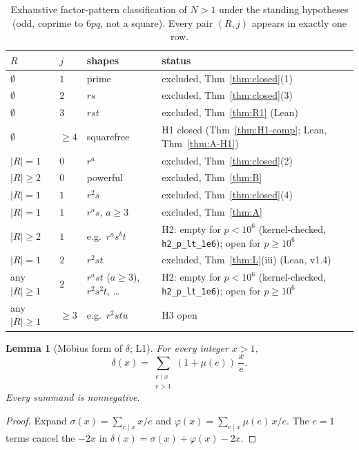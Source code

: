 \documentclass[11pt,reqno]{amsart}
\newcommand{\ph}{\varphi}
\newcommand{\sig}{\sigma}
\newtheorem{lemma}[theorem]{Lemma}
\theoremstyle{definition}
\begin{document}
\begin{table}[ht]
\centering
\caption{Exhaustive factor-pattern classification of \(N>1\) under the standing hypotheses (odd, coprime to \(6pq\), not a square). Every pair \((R,j)\) appears in exactly one row.}
\label{tab:classify}
{\footnotesize
\begin{tabular}{@{}p{1.4cm}p{0.9cm}p{3.4cm}p{5.6cm}@{}}
\toprule
\(R\) & \(j\) & shapes & status \\
\midrule
\(\emptyset\) & \(1\) & prime & excluded, Thm~\ref{thm:closed}(1) \\
\(\emptyset\) & \(2\) & \(rs\) & excluded, Thm~\ref{thm:closed}(3) \\
\(\emptyset\) & \(3\) & \(rst\) & excluded, Thm~\ref{thm:R1} (Lean) \\
\(\emptyset\) & \(\ge 4\) & squarefree & H1 closed (Thm~\ref{thm:H1-comp}; Lean, Thm~\ref{thm:A-H1}) \\
\(|R|=1\) & \(0\) & \(r^a\) & excluded, Thm~\ref{thm:closed}(2) \\
\(|R|\ge 2\) & \(0\) & powerful & excluded, Thm~\ref{thm:B} \\
\(|R|=1\) & \(1\) & \(r^2s\) & excluded, Thm~\ref{thm:closed}(4) \\
\(|R|=1\) & \(1\) & \(r^as\), \(a\ge 3\) & excluded, Thm~\ref{thm:A} \\
\(|R|\ge 2\) & \(1\) & e.g.\ \(r^as^bt\) & H2: empty for \(p<10^6\) (kernel-checked, \texttt{h2\_p\_lt\_1e6}); open for \(p\ge 10^6\) \\
\(|R|=1\) & \(2\) & \(r^2st\) & excluded, Thm~\ref{thm:L}(iii) (Lean, v1.4) \\
any \(|R|\ge 1\) & \(2\) & \(r^ast\) (\(a\ge 3\)), \(r^2s^2t\), \ldots & H2: empty for \(p<10^6\) (kernel-checked, \texttt{h2\_p\_lt\_1e6}); open for \(p\ge 10^6\) \\
any \(|R|\ge 1\) & \(\ge 3\) & e.g.\ \(r^2stu\) & H3 open \\
\bottomrule
\end{tabular}
}
\end{table}

\begin{lemma}[M\"obius form of \(\delta\); L1]
\label{lem:L1}
For every integer \(x>1\),
\[
\delta(x)=\sum_{\substack{e\mid x\\ e>1}}(1+\mu(e))\,\frac{x}{e}.
\]
Every summand is nonnegative.
\end{lemma}

\begin{proof}
Expand \(\sig(x)=\sum_{e\mid x}x/e\) and \(\ph(x)=\sum_{e\mid x}\mu(e)\,x/e\). The \(e=1\) terms cancel the \(-2x\) in \(\delta(x)=\sig(x)+\ph(x)-2x\).
\end{proof}
\end{document}
